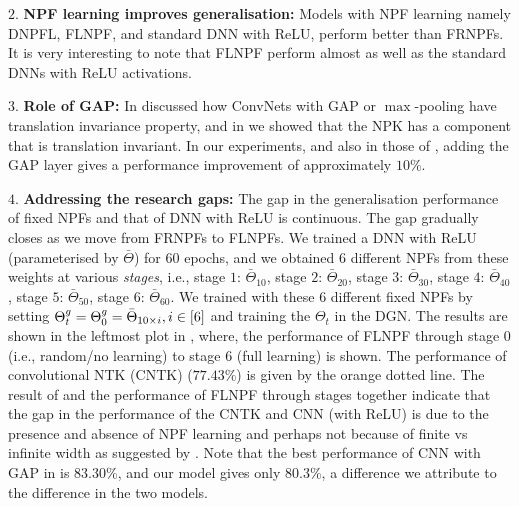 $2.$ \textbf{NPF learning improves generalisation:} Models with NPF learning namely  DNPFL, FLNPF, and standard DNN with ReLU, perform better than FRNPFs. It is very interesting to note that FLNPF perform almost as well as the standard DNNs with ReLU activations. 

$3.$ \textbf{Role of GAP:} In  discussed how ConvNets with GAP or $\max$-pooling have translation invariance property, and in  we showed that the NPK has a component that is translation invariant. In our experiments, and also in those of \cite{arora2019}, adding the GAP layer gives a performance improvement of approximately $10\%$.


$4.$ \textbf{Addressing the research gaps:} The gap in the generalisation performance of fixed NPFs and that of DNN with ReLU is continuous. The gap gradually closes as we move from FRNPFs to FLNPFs. We trained a DNN with ReLU (parameterised by $\bar{\Theta}$) for $60$ epochs, and we obtained $6$ different NPFs from these weights at various \emph{stages}, i.e., stage $1$: $\bar{\Theta}_{10}$, stage $2$: $\bar{\Theta}_{20}$, stage $3$: $\bar{\Theta}_{30}$, stage $4$: $\bar{\Theta}_{40}$, stage $5$: $\bar{\Theta}_{50}$, stage $6$: $\bar{\Theta}_{60}$. We trained with these $6$ different fixed NPFs by setting ${\Theta}^g_t={\Theta}^g_0=\bar{\Theta}_{10\times i}, i\in[6]$ and training the $\Theta_t$ in the DGN. The results are shown in the leftmost plot in , where, the performance of FLNPF through stage $0$ (i.e., random/no learning) to stage $6$ (full learning) is shown. The performance of  convolutional NTK (CNTK) \cite{arora2019exact} ($77.43\%$) is given by the orange dotted line. The result of  and the performance of FLNPF through stages together indicate that the gap in the performance of the CNTK and CNN (with ReLU) is due to the presence and absence of NPF learning and perhaps not because of finite vs infinite width as suggested by \cite{arora2019exact}. Note that the best performance of CNN with GAP in \cite{arora2019exact} is $83.30\%$, and our model gives only $80.3\%$, a difference we attribute to the difference in the two models.



